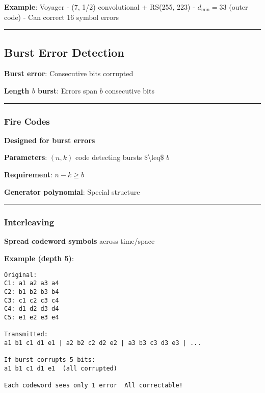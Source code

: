 \textbf{Example}: Voyager - (7, 1/2) convolutional + RS(255, 223) -
\(d_{\min} = 33\) (outer code) - Can correct 16 symbol errors

\begin{center}\rule{0.5\linewidth}{0.5pt}\end{center}

\subsection{Burst Error Detection}\label{burst-error-detection}

\textbf{Burst error}: Consecutive bits corrupted

\textbf{Length \(b\) burst}: Errors span \(b\) consecutive bits

\begin{center}\rule{0.5\linewidth}{0.5pt}\end{center}

\subsubsection{Fire Codes}\label{fire-codes}

\textbf{Designed for burst errors}

\textbf{Parameters}: \((n, k)\) code detecting bursts
\$\textbackslash leq\$ \(b\)

\textbf{Requirement}: \(n - k \geq b\)

\textbf{Generator polynomial}: Special structure

\begin{center}\rule{0.5\linewidth}{0.5pt}\end{center}

\subsubsection{Interleaving}\label{interleaving}

\textbf{Spread codeword symbols} across time/space

\textbf{Example (depth 5)}:

\begin{verbatim}
Original:
C1: a1 a2 a3 a4
C2: b1 b2 b3 b4
C3: c1 c2 c3 c4
C4: d1 d2 d3 d4
C5: e1 e2 e3 e4

Transmitted:
a1 b1 c1 d1 e1 | a2 b2 c2 d2 e2 | a3 b3 c3 d3 e3 | ...

If burst corrupts 5 bits:
a1 b1 c1 d1 e1  (all corrupted)
         
Each codeword sees only 1 error  All correctable!
\end{verbatim}

